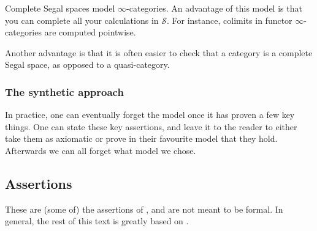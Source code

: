 Complete Segal spaces model $\infty$-categories. An advantage of this model is that you can complete all your calculations in $\mathcal{S}.$ For instance, colimits in functor $\infty$-categories are computed pointwise.

Another advantage is that it is often easier to check that a category is a complete Segal space, as opposed to a quasi-category.

\subsubsection{The synthetic approach}
In practice, one can eventually forget the model once it has proven a few key things. One can state these key assertions, and leave it to the reader to either take them as axiomatic or prove in their favourite model that they hold. Afterwards we can all forget what model we chose.

\subsection{Assertions}
These are (some of) the assertions of \cite{Haugseng-categories-intro}, and are not meant to be formal. In general, the rest of this text is greatly based on \cite{Haugseng-categories-intro}.

